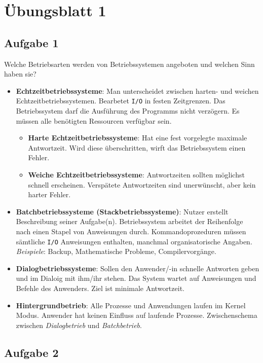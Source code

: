 \chapter{Übungsblatt 1}

\section{Aufgabe 1}

Welche Betriebsarten werden von Betriebssystemen angeboten und welchen Sinn haben sie?

\begin{itemize}
    \item \textbf{Echtzeitbetriebssysteme}: Man unterscheidet zwischen harten- und weichen Echtzeitbetriebssystemen. Bearbetet \texttt{I/O} in festen Zeitgrenzen. Das Betriebssystem darf die Ausführung des Programms nicht verzögern. Es müssen alle benötigten Ressourcen verfügbar sein.
    \begin{itemize}
        \item \textbf{Harte Echtzeitbetriebssysteme}: Hat eine fest vorgelegte maximale Antwortzeit. Wird diese überschritten, wirft das Betriebs\-system einen Fehler.
        \item \textbf{Weiche Echtzeitbetriebssysteme}: Antwortzeiten sollten möglichst schnell erscheinen. Verspätete Antwortzeiten sind unerwünscht, aber kein harter Fehler.
    \end{itemize}
    \item \textbf{Batchbetriebssysteme (Stackbetriebssysteme)}: Nutzer erstellt Beschreibung seiner Aufgabe(n). Betriebssystem arbeitet der Reihenfolge nach einen Stapel von Anweisungen durch. Kommandoprozeduren müssen sämtliche \texttt{I/O} Anweisungen enthalten, manchmal organisatorische Angaben. \textit{Beispiele}: Backup, Mathematische Probleme, Compilervorgänge.
    \item \textbf{Dialogbetriebssysteme}: Sollen den Anwender/-in schnelle Antworten geben und im Dialoig mit ihm/ihr stehen. Das System wartet auf Anweisungen und Befehle des Anwenders. Ziel ist minimale Antwortzeit.
    \item \textbf{Hintergrundbetrieb}: Alle Prozesse und Anwendungen laufen im Kernel Modus. Anwender hat keinen Einfluss auf laufende Prozesse. Zwischenschema zwischen \textit{Dialogbetrieb} und \textit{Batchbetrieb}. 
\end{itemize}

\section{Aufgabe 2}

